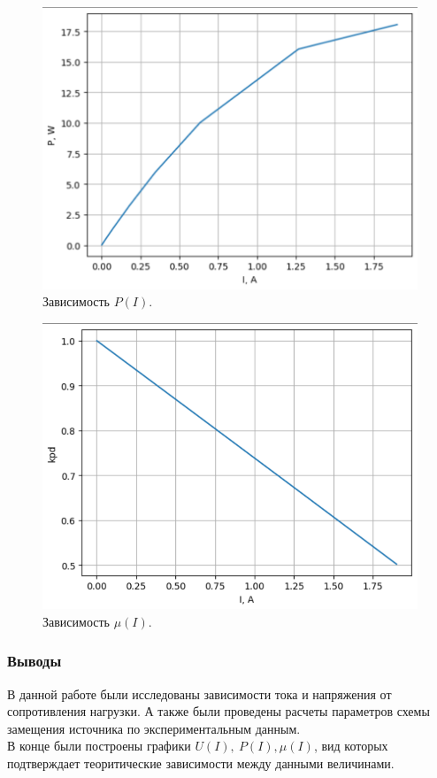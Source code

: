\documentclass[12pt]{article}
\begin{document}
\begin{figure}[H]
    \centering
    \includegraphics[width=\textwidth]{p_i.png}
    \caption{Зависимость $P(I)$.}
    \label{fig:p_i}
\end{figure}

\begin{figure}[H]
    \centering
    \includegraphics[width=\textwidth]{kpd_i.png}
    \caption{Зависимость $\mu(I)$.}
    \label{fig:kpd_i}
\end{figure}

\subsubsection*{Выводы}
В данной работе были исследованы зависимости тока и напряжения от сопротивления нагрузки. А также были проведены расчеты параметров схемы замещения источника по экспериментальным данным.\\
В конце были построены графики $U(I), \ P(I), \mu(I)$, вид которых подтверждает теоритические зависимости между данными величинами.
\end{document}
